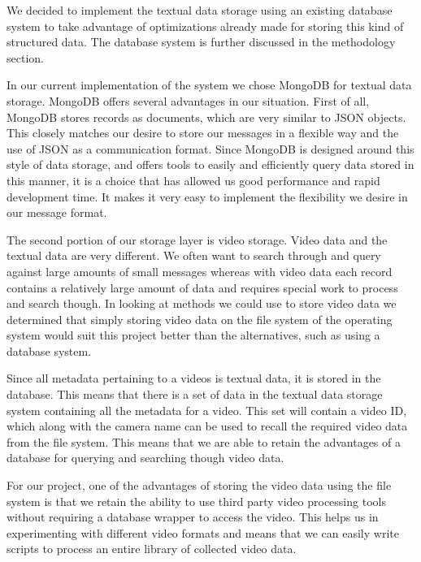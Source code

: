 We decided to implement the textual data storage using an existing database
system to take advantage of optimizations already made for storing this kind of
structured data. The database system is further discussed in the methodology
section.

In our current implementation of the system we chose MongoDB\cite{mongo_home}
for textual data storage. MongoDB offers several advantages in our situation.
First of all, MongoDB stores records as documents, which are very similar to
JSON objects.  This closely matches our desire to store our messages in a
flexible way and the use of JSON as a communication format. Since MongoDB is
designed around this style of data storage, and offers tools to easily and
efficiently query data stored in this manner, it is a choice that has allowed us
good performance and rapid development time. It makes it very easy to implement
the flexibility we desire in our message format.


The second portion of our storage layer is video storage. Video data and the
textual data are very different. We often want to search through and query
against large amounts of small messages whereas with video data each record
contains a relatively large amount of data and requires special work to process
and search though. In looking at methods we could use to store video data we
determined that simply storing video data on the file system of the operating
system would suit this project better than the alternatives, such as using a
database system.

Since all metadata pertaining to a videos is textual data, it is stored in the
database. This means that there is a set of data in the textual data
storage system containing all the metadata for a video. This set will contain a
video ID, which along with the camera name can be used to recall the required
video data from the file system. This means that we are able to retain the
advantages of a database for querying and searching though video data.

For our project, one of the advantages of storing the video data using
the file system is that we retain the ability to use third party video
processing tools without requiring a database wrapper to access the video. This
helps us in experimenting with different video formats and means that we can 
easily write scripts to process an entire library of collected video data.


